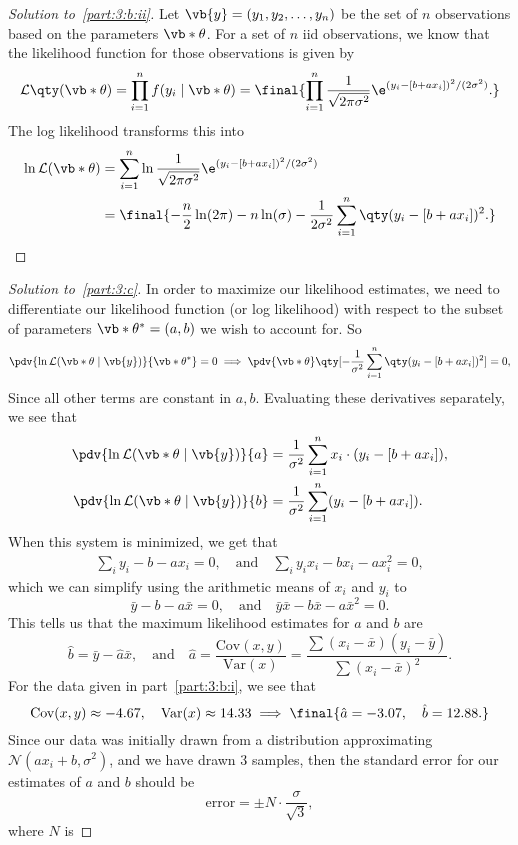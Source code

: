 \documentclass[10pt, physics]{homework}
\begin{document}
	\begin{proof}[Solution to~\ref{part:3:b:ii}]
		Let $\vb{y} = (y_1,y_2,\dots,y_n)$ be the set of $n$ observations based on the parameters $\vb*{\theta}$.
		For a set of $n$ iid observations, we know that the likelihood function for those observations is given by
		\[ \mathcal{L}\qty(\vb*{\theta}) = \prod_{i = 1}^n f(y_i \mid \vb*{\theta}) = \final{\prod_{i = 1}^n \frac{1}{\sqrt{2\pi\sigma^2}}\e^{(y_i-[b+ax_i])^2/(2\sigma^2)}.}\]
		The log likelihood transforms this into
		\begin{align*}
			\ln\mathcal{L}(\vb*{\theta}) &= \sum_{i = 1}^n \ln \frac{1}{\sqrt{2\pi\sigma^2}}\e^{(y_i-[b+ax_i])^2/(2\sigma^2)} \\
			& = \final{-\frac{n}{2}\ln(2\pi) - n\ln(\sigma) - \frac{1}{2\sigma^2}\sum_{i=1}^n\qty(y_i - [b + ax_i])^2.}\qedhere
		\end{align*}
	\end{proof}
	\begin{proof}[Solution to~\ref{part:3:c}]
		In order to maximize our likelihood estimates, we need to differentiate our likelihood function (or log likelihood) with respect to the subset of parameters $\vb*{\theta^*} = (a,b)$ we wish to account for.
		So
		\begin{align*}
			\pdv{\ln\mathcal{L}(\vb*{\theta} \mid \vb{y})}{\vb*{\theta^*}} = 0 \implies \pdv{\vb*{\theta}}\qty[-\frac{1}{\sigma^2}\sum_{i=1}^n \qty(y_i - [b + ax_i])^2] = 0,
		\end{align*}
		Since all other terms are constant in $a,b$.
		Evaluating these derivatives separately, we see that
		\begin{align*}
			\pdv{\ln\mathcal{L}(\vb*{\theta} \mid \vb{y})}{a} &= \frac{1}{\sigma^2}\sum_{i=1}^n x_i\cdot(y_i - [b + ax_i]), \\
			\pdv{\ln\mathcal{L}(\vb*{\theta} \mid \vb{y})}{b} &= \frac{1}{\sigma^2}\sum_{i=1}^n (y_i-[b+ax_i]).
		\end{align*}
		When this system is minimized, we get that
		\begin{align*}
			\sum_i y_i - b - ax_i = 0, \quad\text{and}\quad\sum_i y_ix_i - bx_i -ax_i^2 = 0,
		\end{align*}
		which we can simplify using the arithmetic means of $x_i$ and $y_i$ to 
		\[ \bar{y}-b-a\bar{x} = 0,\quad\text{and}\quad \bar{y}\bar{x}-b\bar{x}-a\bar{x}^2 = 0. \]
		This tells us that the maximum likelihood estimates for $a$ and $b$ are
		\[ \hat{b} = \bar{y} - \hat{a}\bar{x},\quad\text{and}\quad \hat{a} = \frac{\text{Cov}(x,y)}{\text{Var}(x)} = \frac{\sum (x_i-\bar{x})(y_i-\bar{y})}{\sum(x_i-\bar{x})^2}. \]
		For the data given in part~\ref{part:3:b:i}, we see that
		\[ \text{Cov}(x,y) \approx -4.67,\quad\text{Var}(x) \approx 14.33 \implies \final{\hat{a} = -3.07,\quad \hat{b} = 12.88.}\]
		Since our data was initially drawn from a distribution approximating $\mathcal{N}(ax_i+b,\sigma^2)$, and we have drawn 3 samples, then the standard error for our estimates of $a$ and $b$ should be 
		\[ \text{error} = \pm N\cdot\frac{\sigma}{\sqrt{3}}, \]
		where $N$ is 
	\end{proof}
\end{document}
